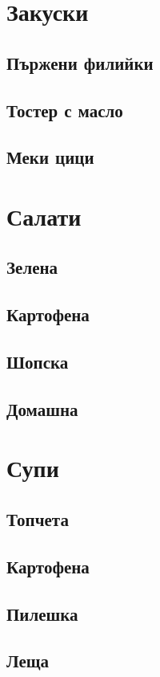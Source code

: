 \documentclass{article}
\begin{document}
\section{Закуски}
    \subsection{Пържени филийки}
    \subsection{Тостер с масло}
    \subsection{Меки цици}

\section{Салати}
    \subsection{Зелена}
    \subsection{Картофена}
    \subsection{Шопска}
    \subsection{Домашна}

\section{Супи}
    \subsection{Топчета}
    \subsection{Картофена}
    \subsection{Пилешка}
    \subsection{Леща}
\end{document}
